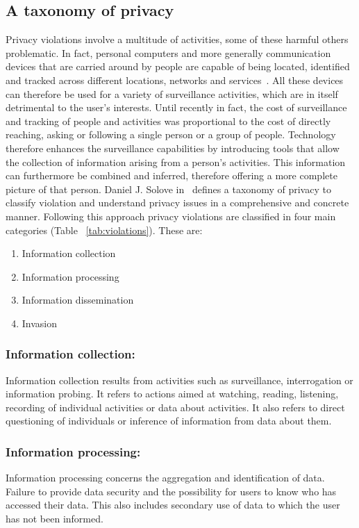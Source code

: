 \subsection{A taxonomy of privacy}
\noindent
Privacy violations involve a multitude of activities, some of these harmful others problematic. In fact, personal computers and more generally communication devices that are carried around by people are capable of being located, identified and tracked across different locations, networks and services~\cite{michael2013location}. All these devices can therefore be used for a variety of surveillance activities, which are in itself detrimental to the user's interests. Until recently in fact, the cost of surveillance and tracking of people and activities was proportional to the cost of directly reaching, asking or following a single person or a group of people. Technology therefore enhances the surveillance capabilities by introducing tools that allow the collection of information arising from a person's activities. This information can furthermore be combined and inferred, therefore offering a more complete picture of that person. Daniel J. Solove in~\cite{solove2006taxonomy} defines a taxonomy of privacy to classify violation and understand privacy issues in a comprehensive and concrete manner. Following this approach privacy violations are classified in four main categories (Table ~\ref{tab:violations}). These are: 

\begin{enumerate}
 \item Information collection
 \item Information processing
 \item Information dissemination
 \item Invasion
\end{enumerate}
 
\subsubsection{Information collection:} 
Information collection results from activities such as surveillance, interrogation or information probing. It refers to actions aimed at watching, reading, listening, recording of individual activities or data about activities. It also refers to direct questioning of individuals or inference of information from data about them.
 
\subsubsection{Information processing:}
Information processing concerns the aggregation and identification of data. Failure to provide data security and the possibility for users to know who has accessed their data. This also includes secondary use of data to which the user has not been informed.
 
